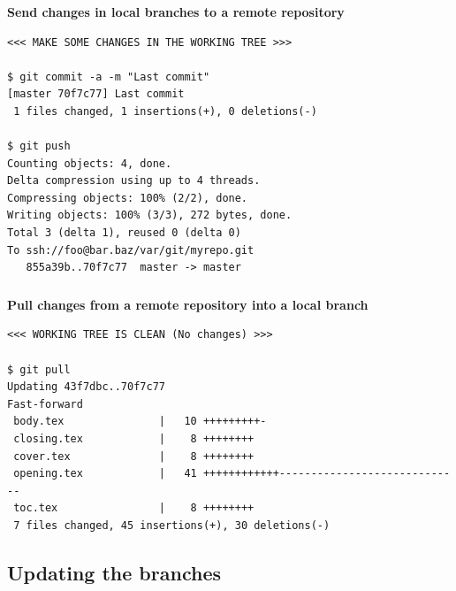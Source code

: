 \begin{frame}[fragile]
  \frametitle{\insertsubsection}
  \textbf{Send changes in local branches to a remote repository}
  \begin{small}
\begin{verbatim}
<<< MAKE SOME CHANGES IN THE WORKING TREE >>>

$ git commit -a -m "Last commit"
[master 70f7c77] Last commit
 1 files changed, 1 insertions(+), 0 deletions(-)

$ git push
Counting objects: 4, done.
Delta compression using up to 4 threads.
Compressing objects: 100% (2/2), done.
Writing objects: 100% (3/3), 272 bytes, done.
Total 3 (delta 1), reused 0 (delta 0)
To ssh://foo@bar.baz/var/git/myrepo.git
   855a39b..70f7c77  master -> master
\end{verbatim}
  \end{small}

\end{frame}


\begin{frame}[fragile]
  \frametitle{\insertsubsection}
  \textbf{Pull changes from a remote repository into a local branch}
  \begin{small}
\begin{verbatim}
<<< WORKING TREE IS CLEAN (No changes) >>>

$ git pull
Updating 43f7dbc..70f7c77
Fast-forward
 body.tex               |   10 +++++++++-
 closing.tex            |    8 ++++++++
 cover.tex              |    8 ++++++++
 opening.tex            |   41 ++++++++++++-----------------------------
 toc.tex                |    8 ++++++++
 7 files changed, 45 insertions(+), 30 deletions(-)
\end{verbatim}
  \end{small}

\end{frame}


\subsection{Updating the branches}

